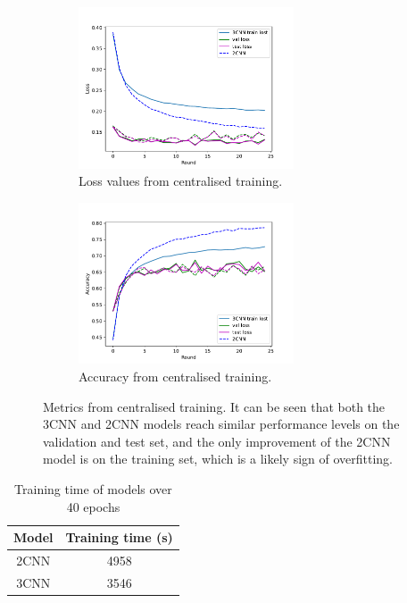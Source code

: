 \documentclass{article}
\begin{document}
\begin{figure}
  \centering
  \begin{subfigure}[b]{0.45\textwidth}
    \centering
    \includegraphics[width=0.7\textwidth]{images/initial_training}
    \caption{Loss values from centralised training.}
    \label{fig:central_train_loss}
  \end{subfigure}
  \hfill
  \begin{subfigure}[b]{0.45\textwidth}
    \centering
    \includegraphics[width=0.7\textwidth]{images/initial_training_acc}
    \caption{Accuracy from centralised training.}
    \label{fig:central_train_acc}
  \end{subfigure}

  \caption{Metrics from centralised training. It can be seen that both the 3CNN and 2CNN models reach similar performance levels on the validation and test set, and the only improvement of the 2CNN model is on the training set, which is a likely sign of overfitting.}
  \label{fig:central_train}
\end{figure}

\begin{table}
  \centering
  \begin{tabular}{cc}
    \hline
    Model & Training time (s) \\
    \hline
    2CNN  & 4958              \\
    3CNN  & 3546
  \end{tabular}
  \caption{Training time of models over 40 epochs}
  \label{tbl:train_time}
\end{table}
\end{document}
